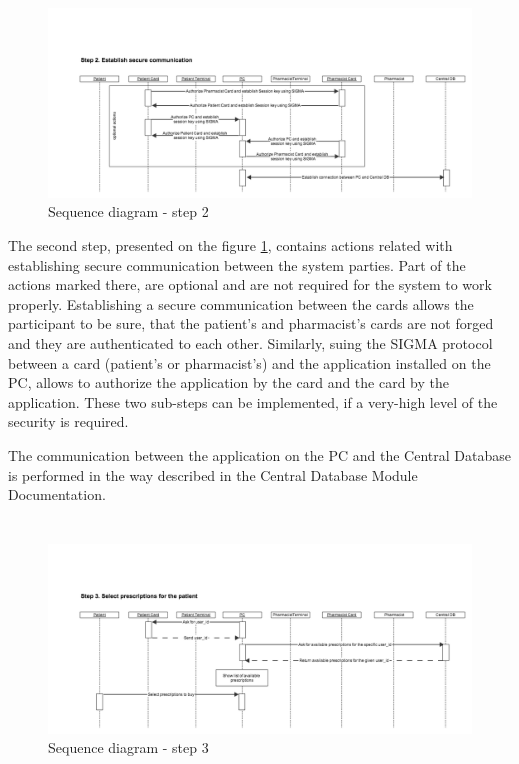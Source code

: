 \section{}
\begin{figure}	
	\hspace*{-1.5in}
    \includegraphics[scale=0.45]{s_d_2.png}
    \caption{Sequence diagram - step 2}
    \label{fig:s_q_step_2}
\end{figure} 

The second step, presented on the figure \ref{fig:s_q_step_2}, contains actions related with establishing secure communication  between the system parties. Part of the actions marked there, are optional and are not required for the system to work properly. Establishing a secure communication between the cards allows the participant to be sure, that the patient's and pharmacist's cards are not forged and they are authenticated to each other.
Similarly, suing the SIGMA protocol between a card (patient's or pharmacist's) and the application installed on the PC, allows to authorize the application by the card and the card by the application. These two sub-steps can be implemented, if a very-high level of the security is required. 

The communication between the application on the PC and the Central Database is performed in the way described in the Central Database Module Documentation.

\section{}
\begin{figure}	
	\hspace*{-1.5in}
    \includegraphics[scale=0.45]{s_d_3.png}
    \caption{Sequence diagram - step 3}
    \label{fig:s_q_step_3}
\end{figure} 

